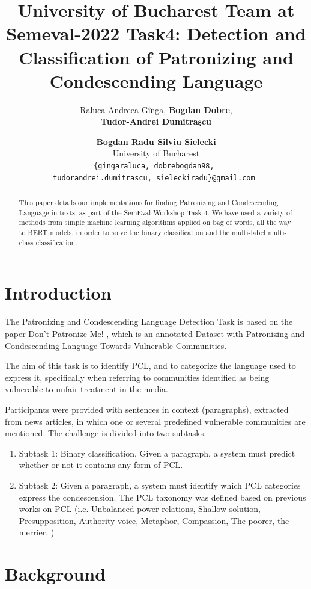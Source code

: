 \documentclass[11pt]{article}
\title{University of Bucharest Team at Semeval-2022 Task4: Detection and
	Classification of Patronizing and Condescending Language}
\author{Raluca Andreea G\^inga, {\bf Bogdan Dobre},  \\  {\bf Tudor-Andrei Dumitra\c{s}cu} \and {\bf Bogdan Radu Silviu Sielecki}\\
University of Bucharest \\
\texttt{\{gingaraluca, dobrebogdan98, }\\
\texttt{tudorandrei.dumitrascu, sieleckiradu\}@gmail.com }
}
\begin{document}
\maketitle

\begin{abstract}
	This paper details our implementations for finding Patronizing and
	Condescending Language in texts, as part of the SemEval Workshop Task 4.
	We have used a variety of methods from simple machine learning algorithms applied
	on bag of words, all the way to BERT models, in order to solve the binary classification
	and the multi-label multi-class classification.
\end{abstract}

\section{Introduction}

The Patronizing and Condescending Language Detection Task \cite{perezalmendros2022semeval} is based on the
paper Don't Patronize Me! \cite{perezalmendros2020dont}, which is an annotated Dataset with Patronizing and
Condescending Language Towards Vulnerable Communities.

The aim of this task is to identify PCL, and to categorize the language
used to express it, specifically when referring to communities
identified as being vulnerable to unfair treatment in the media.

Participants were provided with sentences in context (paragraphs), extracted
from news articles, in which one or several predefined vulnerable
communities are mentioned. The challenge is divided into two subtasks.

\begin{enumerate}
	\item Subtask 1: Binary classification. Given a paragraph, a system must
	      predict whether or not it contains any form of PCL.

	\item Subtask 2: Given a paragraph, a system must identify which PCL
	      categories express the condescension. The PCL taxonomy was defined
	      based on previous works on PCL (i.e. Unbalanced power relations, Shallow
	      solution, Presupposition, Authority voice, Metaphor, Compassion, The poorer,
	      the merrier. )
\end{enumerate}


\section{Background}
\end{document}
